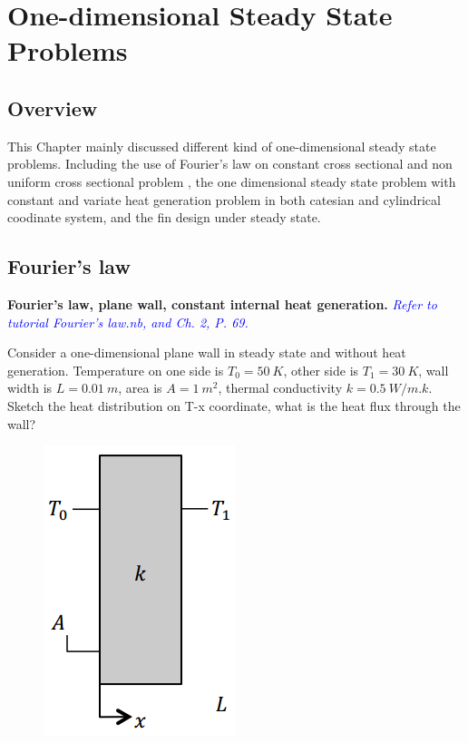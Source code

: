 \newtheorem{problem}{Problem}[section]

\chapter{One-dimensional Steady State Problems}

\section{Overview}
This Chapter mainly discussed different kind of one-dimensional steady state problems. Including the use of Fourier’s law on constant cross sectional and non uniform cross sectional problem , the one dimensional steady state problem with constant and variate heat generation problem in both catesian and cylindrical coodinate system, and the fin design under steady state.

\section{Fourier's law}

\begin{example}
\textbf{Fourier’s law, plane wall, constant internal heat
generation.} \textcolor{blue} {\emph{Refer to tutorial Fourier’s
law.nb, and Ch. 2, P. 69.}}

Consider a one-dimensional plane wall in steady state and without heat generation.
Temperature on one side is $T_0=50~K$, other side is $T_1=30~K$, wall width is $L=0.01~m$,
area is $A=1~m^2$, thermal conductivity $k=0.5~W/m.k$. Sketch the heat distribution on T-x coordinate,
what is the heat flux  through the wall?
\begin{figure}[h!]
  \centering
    \includegraphics[scale=0.6]{figures/ch2/1}
\end{figure}
\end{example}

